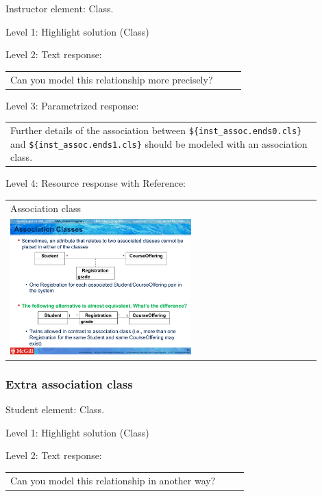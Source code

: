Instructor element: Class. \medskip

\noindent Level 1: Highlight solution (Class) \medskip

\noindent Level 2: Text response: \medskip

\begin{tabular}{|p{0.9\linewidth}}
Can you model this relationship more precisely?
\end{tabular} \medskip

\noindent Level 3: Parametrized response: \medskip

\begin{tabular}{|p{0.9\linewidth}}
Further details of the association between \verb|${inst_assoc.ends0.cls}| and \verb|${inst_assoc.ends1.cls}| should be modeled with an association class.
\end{tabular} \medskip

\noindent Level 4: Resource response with Reference: \medskip

\begin{tabular}{|p{0.9\linewidth}}
Association class

\\
\includegraphics[width=0.6\textwidth]{images/association_class.png}
\end{tabular} \medskip


\subsubsection{Extra association class}

Student element: Class.  \medskip

\noindent Level 1: Highlight solution (Class) \medskip

\noindent Level 2: Text response: \medskip

\begin{tabular}{|p{0.9\linewidth}}
Can you model this relationship in another way?
\end{tabular} \medskip

